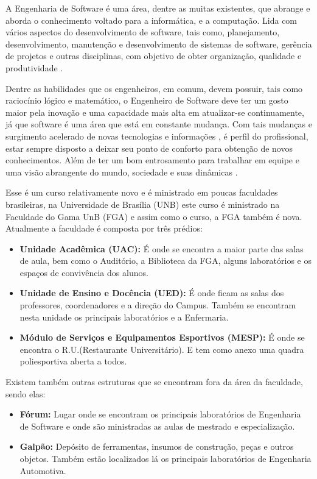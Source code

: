 A Engenharia de Software é uma área, dentre as muitas existentes, que abrange  e aborda o conhecimento voltado para
a informática, e a computação. Lida com vários aspectos do desenvolvimento de software, tais como, planejamento,
 desenvolvimento, manutenção e desenvolvimento de sistemas de software, gerência de projetos e outras disciplinas,
 com objetivo de obter organização, qualidade e produtividade \cite{gungor}.

Dentre as habilidades que os engenheiros, em comum, devem possuir, tais como raciocínio lógico e matemático, o Engenheiro de Software deve ter um gosto maior pela inovação e uma capacidade mais alta em atualizar-se continuamente, já que software é uma área que está em constante mudança. Com tais mudanças e surgimento acelerado de novas tecnologias e informações \cite{daneels}, é perfil do profissional, estar sempre disposto a deixar seu ponto de conforto para obtenção de novos conhecimentos. Além de ter um bom entrosamento para trabalhar em equipe e uma visão abrangente do mundo, sociedade
e suas dinâmicas \cite{daneels}.

Esse é um curso relativamente novo e é ministrado em poucas faculdades brasileiras, na Universidade de Brasília (UNB) este curso é ministrado na Faculdade do Gama UnB (FGA) e assim como o curso, a FGA também é nova. Atualmente a faculdade é composta por três prédios:

\begin{itemize}
\item \textbf{Unidade Acadêmica (UAC)}\textbf{:} É onde se encontra a maior parte das salas de aula, bem como o Auditório, a Biblioteca da FGA, alguns laboratórios e os espaços de convivência dos alunos.
\item \textbf{Unidade de Ensino e Docência (UED):} É onde ficam as salas dos professores, coordenadores e a direção do Campus. Também se encontram nesta unidade os principais laboratórios e a Enfermaria.
\item \textbf{Módulo de Serviços e Equipamentos Esportivos (MESP):} É onde se encontra o R.U.(Restaurante Universitário). E tem como anexo uma quadra poliesportiva aberta a todos.
\end{itemize}

Existem também outras estruturas que se encontram fora da área da faculdade, sendo elas:

\begin{itemize}
\item \textbf{Fórum: }Lugar onde se encontram os principais laboratórios de Engenharia de Software e onde são ministradas as aulas de mestrado e especialização.
\item \textbf{Galpão: }Depósito de ferramentas, insumos de construção, peças e outros objetos. Também estão localizados lá os principais laboratórios de Engenharia Automotiva.
\end{itemize}

